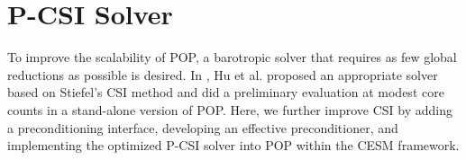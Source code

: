 \section{P-CSI Solver} \label{se:psi}
To improve the scalability of  POP, a barotropic solver that
requires as few global reductions as possible is desired.
In \cite{hu2013scalable}, Hu et al. proposed an appropriate solver based
on Stiefel's CSI method and did a preliminary
evaluation at modest core counts in a stand-alone version of POP.
Here, we further improve CSI by adding a preconditioning interface,
developing an effective preconditioner, and implementing the optimized
P-CSI solver into POP within the CESM framework.


